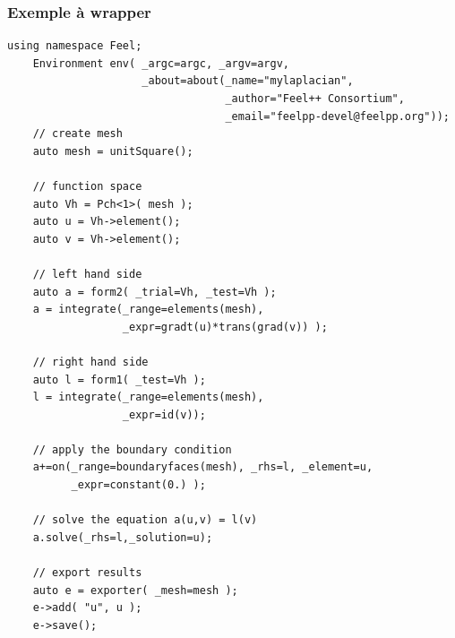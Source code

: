 \documentclass[french,12pt]{article}
\begin{document}
\subsubsection{Exemple à wrapper}
\begin{lstlisting}
using namespace Feel;
    Environment env( _argc=argc, _argv=argv,
                     _about=about(_name="mylaplacian",
                                  _author="Feel++ Consortium",
                                  _email="feelpp-devel@feelpp.org"));
    // create mesh
    auto mesh = unitSquare();

    // function space
    auto Vh = Pch<1>( mesh );
    auto u = Vh->element();
    auto v = Vh->element();

    // left hand side
    auto a = form2( _trial=Vh, _test=Vh );
    a = integrate(_range=elements(mesh),
                  _expr=gradt(u)*trans(grad(v)) );

    // right hand side
    auto l = form1( _test=Vh );
    l = integrate(_range=elements(mesh),
                  _expr=id(v));

    // apply the boundary condition
    a+=on(_range=boundaryfaces(mesh), _rhs=l, _element=u,
          _expr=constant(0.) );

    // solve the equation a(u,v) = l(v)
    a.solve(_rhs=l,_solution=u);

    // export results
    auto e = exporter( _mesh=mesh );
    e->add( "u", u );
    e->save();
\end{lstlisting}
\end{document}
